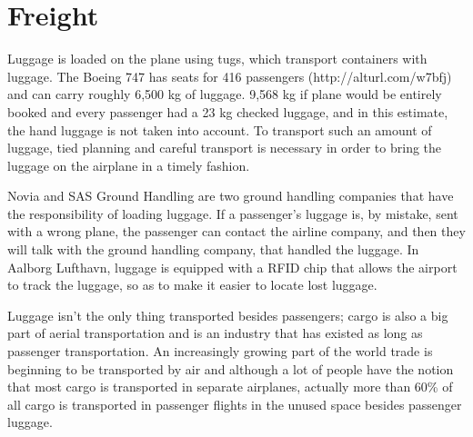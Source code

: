 \section{Freight}
Luggage is loaded on the plane using tugs, which transport containers with luggage. The Boeing 747 has seats for 416 passengers (http://alturl.com/w7bfj) and can carry roughly 6,500 kg of luggage. %
9,568 kg if plane would be entirely booked and every passenger had a 23 kg checked luggage, and in this estimate, the hand luggage is not taken into account. To transport such an amount of luggage, tied planning and careful transport is necessary in order to bring the luggage on the airplane in a timely fashion. %


Novia and SAS Ground Handling are two ground handling companies that have the responsibility of loading luggage\cite{mistet_bagage}. If a passenger's luggage is, by mistake, sent with a wrong plane, the passenger can contact the airline company, and then they will talk with the ground handling company, that handled the luggage. In Aalborg Lufthavn, luggage is equipped with a RFID chip that allows the airport to track the luggage, so as to make it easier to locate lost luggage.


Luggage isn't the only thing transported besides passengers; cargo is also a big part of aerial transportation and is an industry that has existed as long as passenger transportation. An increasingly growing part of the world trade is beginning to be transported by air and although a lot of people have the notion that most cargo is transported in separate airplanes, actually more than 60\% of all cargo is transported in passenger flights in the unused space besides passenger luggage.


